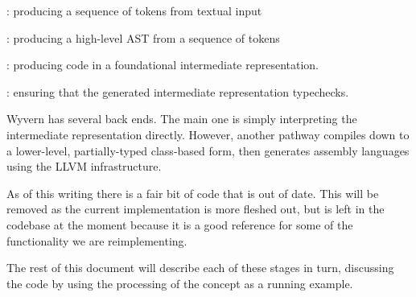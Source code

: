 \documentclass{article}
\begin{document}
\begin{mdOl}[class={ol,compact},elem={ol},data-line={57}]%
\begin{mdLi}[class={li,ol-li,compact-li},label={[(1)]\{.ol-li-label\}},elem={li},data-line={57}]%
{}%
{}: producing a sequence of tokens from textual input%
\end{mdLi}%
\begin{mdLi}[class={li,ol-li,compact-li},label={[(2)]\{.ol-li-label\}},elem={li},data-line={58}]%
{}%
{}: producing a high-level AST from a sequence of tokens%
\end{mdLi}%
\begin{mdLi}[class={li,ol-li,compact-li},label={[(3)]\{.ol-li-label\}},elem={li},data-line={59}]%
{}%
{}: producing code in a foundational
intermediate representation.%
\end{mdLi}%
\begin{mdLi}[class={li,ol-li,compact-li},label={[(4)]\{.ol-li-label\}},elem={li},data-line={61}]%
{}%
{}: ensuring that the generated intermediate
representation typechecks.%
\end{mdLi}%
\end{mdOl}%
\begin{mdP}[data-line={64}]%
{}Wyvern has several back ends.  The main one is simply interpreting the
intermediate representation directly.  However, another pathway compiles
down to a lower-level, partially-typed class-based form, then generates
assembly languages using the LLVM infrastructure.%
\end{mdP}%
\begin{mdP}[class={indent},data-line={69}]%
{}As of this writing there is a fair bit of code that is out of date.
This will be removed as the current implementation is more fleshed out,
but is left in the codebase at the moment because it is a good reference
for some of the functionality we are reimplementing.%
\end{mdP}%
\begin{mdP}[class={indent},data-line={74}]%
{}The rest of this document will describe each of these stages in turn,
discussing the code by using the processing of the %
{}%
{} concept as
a running example.%
\end{mdP}%
\end{document}
